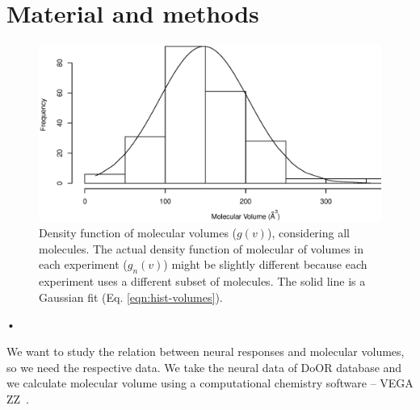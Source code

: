 \documentclass[11pt]{paper} %
\begin{document}











\section{Material and methods}
\begin{figure}
	\centering
	\includegraphics[width=0.5 \textwidth]{fig/hist-volumes}
	\caption{Density function of molecular volumes ($g(v)$), considering all molecules. 
		The actual density function of molecular of volumes in each experiment ($g_n(v)$) might be slightly different 
		because each experiment uses a different subset of molecules. 
		The solid line is a Gaussian fit (Eq. \ref{eqn:hist-volumes}).}
	\label{fig:hist-volumes}
\end{figure}•

We want to study the relation between neural responses and molecular volumes, so we need the respective data. 
We take the neural data of DoOR database \cite{DoOR2010} and we calculate molecular volume using a computational chemistry software -- VEGA ZZ~\cite{}. 
\end{document}
